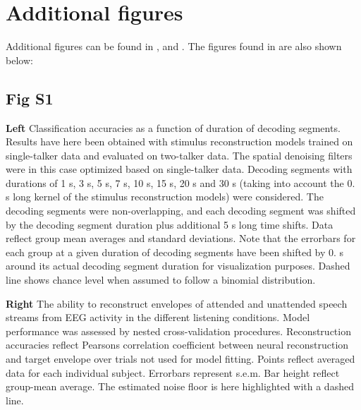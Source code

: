 \section*{\label{_addfigure}%
Additional figures}

Additional figures can be found in \textquotesingle{}, \textquotesingle{} and \textquotesingle{}. The figures found in \textquotesingle{} are also shown below\+:

\subsection*{Fig S1 }

{\bfseries{Left}} Classification accuracies as a function of duration of decoding segments. Results have here been obtained with stimulus reconstruction models trained on single-\/talker data and evaluated on two-\/talker data. The spatial denoising filters were in this case optimized based on single-\/talker data. Decoding segments with durations of 1 s, 3 s, 5 s, 7 s, 10 s, 15 s, 20 s and 30 s (taking into account the 0. s long kernel of the stimulus reconstruction models) were considered. The decoding segments were non-\/overlapping, and each decoding segment was shifted by the decoding segment duration plus additional 5 s long time shifts. Data reflect group mean averages and standard deviations. Note that the errorbars for each group at a given duration of decoding segments have been shifted by 0. s around its actual decoding segment duration for visualization purposes. Dashed line shows chance level when assumed to follow a binomial distribution.

{\bfseries{Right}} The ability to reconstruct envelopes of attended and unattended speech streams from E\+EG activity in the different listening conditions. Model performance was assessed by nested cross-\/validation procedures. Reconstruction accuracies reflect Pearson\textquotesingle{}s correlation coefficient between neural reconstruction and target envelope over trials not used for model fitting. Points reflect averaged data for each individual subject. Errorbars represent s.\+e.\+m. Bar height reflect group-\/mean average. The estimated noise floor is here highlighted with a dashed line.

~\newline
 ~\newline
   ~\newline
 ~\newline


